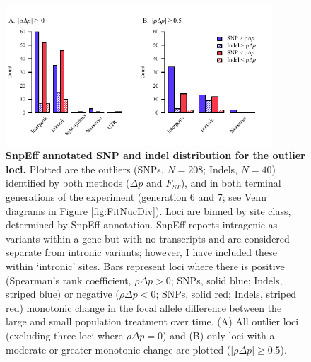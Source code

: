 \FloatBarrier
\begin{figure}[!h]
    \centering
    \includegraphics[width=0.89\textwidth]{Chp4_DNA/2023_BarplotOutANN.pdf}
\caption[SnpEff annotated SNP and indel distribution for the outlier loci.]{\textbf{SnpEff annotated SNP and indel distribution for the outlier loci.} Plotted are the outliers (SNPs, $N= 208$; Indels, $N = 40$) identified by both methods ($\Delta p$ and $F_{ST}$), and in both terminal generations of the experiment (generation 6 and 7; see Venn diagrams in Figure \ref{fig:FitNucDiv}). Loci are binned by site class, determined by SnpEff annotation. SnpEff reports intragenic as variants within a gene but with no transcripts and are considered separate from intronic variants; however, I have included these within ‘intronic’ sites. Bars represent loci where there is positive (Spearman’s rank coefficient, $\rho\Delta p > 0$; SNPs, solid blue; Indels, striped blue) or negative ($\rho\Delta p < 0$; SNPs, solid red; Indels, striped red) monotonic change in the focal allele difference between the large and small population treatment over time. (A) All outlier loci (excluding three loci where $\rho\Delta p = 0$) and (B) only loci with a moderate or greater monotonic change are plotted ($|\rho\Delta p| \geq 0.5$). }
    \label{fig:FitSNPannoDist}
\end{figure}

